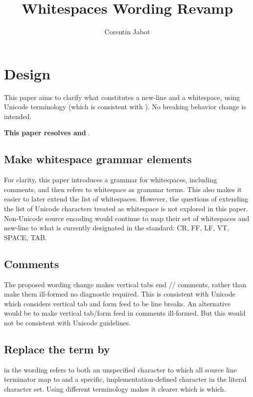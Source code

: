 \documentclass{wg21}
\title{Whitespaces Wording Revamp}
\author{Corentin Jabot}{corentin.jabot@gmail.com}
\begin{document}
\maketitle

\section{Design}

This paper aims to clarify what constitutes a new-line and a whitespace, using Unicode terminology (which is consistent with ).
No breaking behavior change is intended.

\textbf{This paper resolves  and  }.

\subsection{Make whitespace grammar elements}

For clarity, this paper introduces a grammar for whitespaces, including comments, and then refers to whitespace as grammar terms.
This also makes it easier to later extend the list of whitespaces.
However, the questions of extending the list of Unicode characters
treated as whitespace is not explored in this paper.
Non-Unicode source encoding would continue to map their set of whitespaces and new-line to what is currently designated in the standard: CR, FF, LF, VT, SPACE, TAB.

\subsection{Comments}

The proposed wording change makes vertical tabs end // comments, rather than make them ill-formed no diagnostic required.
This is consistent with Unicode which considers vertical tab and form feed to be line breaks.
An alternative would be to make vertical tab/form feed in comments ill-formed. But this would not be consistent with Unicode guidelines.

\subsection{Replace the term  by }

 in the wording refers to both an unspecified character to which all source line terminator map to and
a specific, implementation-defined character in the literal character set.
Using different terminology makes it clearer which is which.
\end{document}

